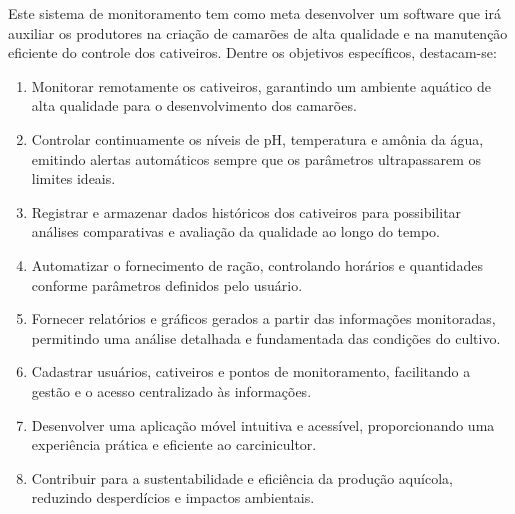 Este sistema de monitoramento tem como meta desenvolver um software que irá auxiliar os produtores na criação de camarões de alta qualidade e na manutenção eficiente do controle dos cativeiros. Dentre os objetivos específicos, destacam-se:

\begin{enumerate}

\item Monitorar remotamente os cativeiros, garantindo um ambiente aquático de alta qualidade para o desenvolvimento dos camarões.

\item Controlar continuamente os níveis de pH, temperatura e amônia da água, emitindo alertas automáticos sempre que os parâmetros ultrapassarem os limites ideais.

\item Registrar e armazenar dados históricos dos cativeiros para possibilitar análises comparativas e avaliação da qualidade ao longo do tempo.

\item Automatizar o fornecimento de ração, controlando horários e quantidades conforme parâmetros definidos pelo usuário.

\item Fornecer relatórios e gráficos gerados a partir das informações monitoradas, permitindo uma análise detalhada e fundamentada das condições do cultivo.

\item Cadastrar usuários, cativeiros e pontos de monitoramento, facilitando a gestão e o acesso centralizado às informações.

\item Desenvolver uma aplicação móvel intuitiva e acessível, proporcionando uma experiência prática e eficiente ao carcinicultor.

\item Contribuir para a sustentabilidade e eficiência da produção aquícola, reduzindo desperdícios e impactos ambientais.
\end{enumerate}